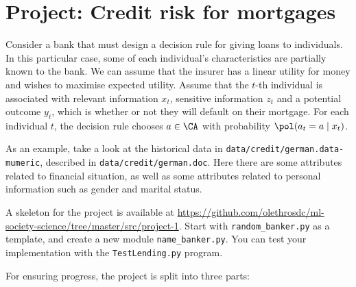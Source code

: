 \section{Project: Credit risk for mortgages}

Consider a bank that must design a decision rule for giving loans to individuals. In this particular case, some of each individual's characteristics are partially known to the bank.  We can assume that the insurer has a linear utility for money and wishes to maximise expected utility. Assume that the $t$-th individual is associated with relevant information $x_t$, sensitive information $z_t$ and a potential outcome $y_t$, which is whether or not they will default on their mortgage. For each individual $t$, the decision rule chooses $a \in \CA$ with probability $\pol(a_t = a \mid x_t)$.

As an example, take a look at the historical data in \texttt{data/credit/german.data-mumeric}, described in \texttt{data/credit/german.doc}. Here there are some attributes related to financial situation, as well as some attributes related to personal information such as gender and marital status. 

A skeleton for the project is available at \url{https://github.com/olethrosdc/ml-society-science/tree/master/src/project-1}. Start with \verb|random_banker.py| as a template, and create a new module \verb|name_banker.py|. You can test your implementation with the \verb|TestLending.py| program. 

For ensuring progress, the project is split into three parts:
